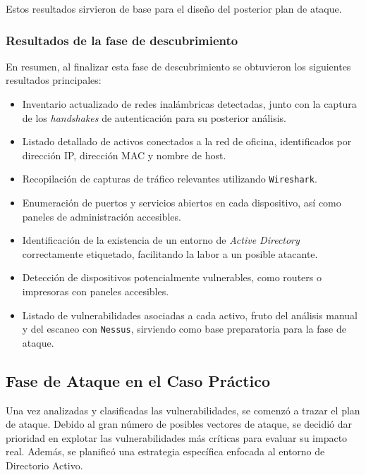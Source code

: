 \documentclass[a4paper, 11pt]{article}
\begin{document}
Estos resultados sirvieron de base para el diseño del posterior plan de ataque.

\subsubsection{Resultados de la fase de descubrimiento}

En resumen, al finalizar esta fase de descubrimiento se obtuvieron los siguientes resultados principales:

\begin{itemize}
    \item Inventario actualizado de redes inalámbricas detectadas, junto con la captura de los \textit{handshakes} de autenticación para su posterior análisis.
    \item Listado detallado de activos conectados a la red de oficina, identificados por dirección IP, dirección MAC y nombre de host.
    \item Recopilación de capturas de tráfico relevantes utilizando \texttt{Wireshark}.
    \item Enumeración de puertos y servicios abiertos en cada dispositivo, así como paneles de administración accesibles.
    \item Identificación de la existencia de un entorno de \textit{Active Directory} correctamente etiquetado, facilitando la labor a un posible atacante.
    \item Detección de dispositivos potencialmente vulnerables, como routers o impresoras con paneles accesibles.
    \item Listado de vulnerabilidades asociadas a cada activo, fruto del análisis manual y del escaneo con \texttt{Nessus}, sirviendo como base preparatoria para la fase de ataque.
\end{itemize}







\subsection{Fase de Ataque en el Caso Práctico}

Una vez analizadas y clasificadas las vulnerabilidades, se comenzó a trazar el plan de ataque. Debido al gran número de posibles vectores de ataque, se decidió dar prioridad en explotar las vulnerabilidades más críticas para evaluar su impacto real. Además, se planificó una estrategia específica enfocada al entorno de Directorio Activo.
\end{document}
